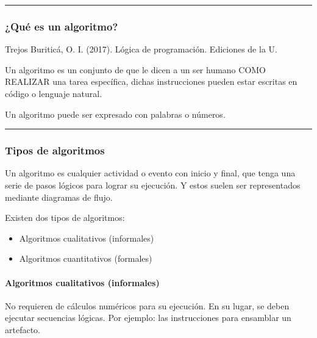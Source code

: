 \documentclass[letterpaper,10pt,spanish]{sphinxmanual}
\begin{document}
\bigskip\hrule\bigskip



\subsubsection{¿Qué es un algoritmo?}
\label{\detokenize{1_guias/10programacion/G1023:que-es-un-algoritmo}}
\sphinxAtStartPar
%
\begin{footnote}[2]\sphinxAtStartFootnote
Trejos Buriticá, O. I. (2017). Lógica de programación. Ediciones de la U.
%
\end{footnote} Un algoritmo es un conjunto de  que le dicen a un ser humano COMO REALIZAR una tarea específica, dichas instrucciones pueden estar escritas en código o lenguaje natural.

\sphinxAtStartPar
Un algoritmo puede ser expresado con palabras o números.


\bigskip\hrule\bigskip



\subsubsection{Tipos de algoritmos}
\label{\detokenize{1_guias/10programacion/G1023:tipos-de-algoritmos}}
\sphinxAtStartPar
Un algoritmo es cualquier actividad o evento con inicio y final, que tenga una serie de pasos lógicos para lograr su ejecución. Y estos suelen ser representados mediante diagramas de flujo.

\sphinxAtStartPar
Existen dos tipos de algoritmos:
\begin{itemize}
\item {} 
\sphinxAtStartPar
Algoritmos cualitativos (informales)

\item {} 
\sphinxAtStartPar
Algoritmos cuantitativos (formales)

\end{itemize}


\paragraph{Algoritmos cualitativos (informales)}
\label{\detokenize{1_guias/10programacion/G1023:algoritmos-cualitativos-informales}}
\sphinxAtStartPar
No requieren de cálculos numéricos para su ejecución. En su lugar, se deben ejecutar secuencias lógicas. Por ejemplo: las instrucciones para ensamblar un artefacto.
\end{document}
